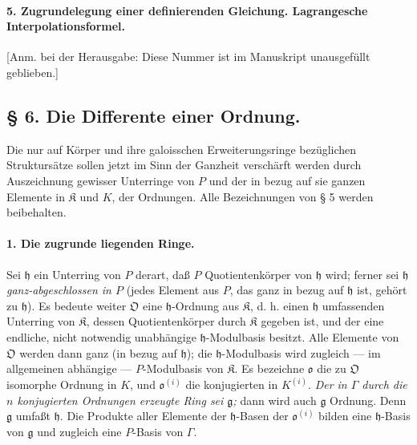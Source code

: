 \paragraph{5. Zugrundelegung einer definierenden Gleichung. Lagrangesche Interpolationsformel.}
[Anm. bei der Herausgabe: Diese Nummer ist im Manuskript unausgefüllt geblieben.]
\subsection*{\S{} 6. Die Differente einer Ordnung.}

Die nur auf Körper und ihre galoisschen Erweiterungsringe bezüglichen Struktursätze sollen jetzt im Sinn der Ganzheit verschärft werden durch Auszeichnung gewisser Unterringe von $P$ und der in bezug auf sie ganzen Elemente in $\mathfrak K$ und $K$, der Ordnungen. Alle Bezeichnungen von § 5 werden beibehalten.

\paragraph{1. Die zugrunde liegenden Ringe.}
Sei $\mathfrak h$ ein Unterring von $P$ derart, daß $P$ Quotientenkörper von $\mathfrak h$ wird; ferner sei $\mathfrak h$ \emph{ganz-abgeschlossen in $P$} (jedes Element aus $P$, das ganz in bezug auf $\mathfrak h$ ist, gehört zu $\mathfrak h$). Es bedeute weiter $\mathfrak O$ eine $\mathfrak h$-Ordnung aus $\mathfrak K$, d. h. einen $\mathfrak h$ umfassenden Unterring von $\mathfrak K$, dessen Quotientenkörper durch $\mathfrak K$ gegeben ist, und der eine endliche, nicht notwendig unabhängige $\mathfrak h$-Modulbasis besitzt. Alle Elemente von $\mathfrak O$ werden dann ganz (in bezug auf $\mathfrak h$); die $\mathfrak h$-Modulbasis wird zugleich --- im allgemeinen abhängige --- $P$-Modulbasis von $\mathfrak K$. Es bezeichne $\mathfrak o$ die zu $\mathfrak O$ isomorphe Ordnung in $K$, und $\mathfrak o^{(i)}$ die konjugierten in $K^{(i)}$. \emph{Der in $\Gamma$ durch die $n$ konjugierten Ordnungen erzeugte Ring sei $\mathfrak g$;} dann wird auch $\mathfrak g$ Ordnung. Denn $\mathfrak g$ umfaßt $\mathfrak h$. Die Produkte aller Elemente der $\mathfrak h$-Basen der $\mathfrak o^{(i)}$ bilden eine $\mathfrak h$-Basis von $\mathfrak g$ und zugleich eine $P$-Basis von $\Gamma$.

